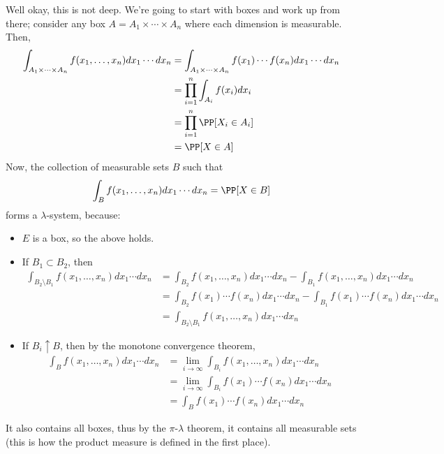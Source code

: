 \documentclass[11pt, headheight=30pt]{scrartcl}
\begin{document}
Well okay, this is not deep. We're going to start with boxes and work up
from there; consider any box $A = A_1\times \cdots \times A_n$ where
each dimension is measurable. Then,
\begin{align*}
    \int_{A_1\times \cdots \times A_n} f(x_1, \dots, x_n)dx_1\cdots dx_n
    &= \int_{A_1\times \cdots \times A_n} f(x_1)\cdots f(x_n)dx_1\cdots dx_n\\
    &= \prod_{i=1}^n \int_{A_i} f(x_i)dx_i\\
    &= \prod_{i=1}^n \PP[X_i\in A_i]\\
    &= \PP[X\in A]
\end{align*}
Now, the collection of measurable sets $B$ such that
\[
    \int_B f(x_1, \dots, x_n)dx_1\cdots dx_n = \PP[X\in B]
\]
forms a $\lambda$-system, because:
\begin{itemize}
    \item $E$ is a box, so the above holds.
    \item If $B_1\subset B_2$, then
    \begin{align*}
        \int_{B_2\setminus B_1} f(x_1, \dots, x_n)dx_1\cdots dx_n &= \int_{B_2} f(x_1, \dots, x_n)dx_1\cdots dx_n - \int_{B_1} f(x_1, \dots, x_n)dx_1\cdots dx_n\\
        &= \int_{B_2} f(x_1)\cdots f(x_n)dx_1\cdots dx_n - \int_{B_1} f(x_1)\cdots f(x_n)dx_1\cdots dx_n\\
        &= \int_{B_2\setminus B_1} f(x_1, \dots, x_n)dx_1\cdots dx_n
    \end{align*}
    \item If $B_i\uparrow B$, then by the monotone convergence theorem,
    \begin{align*}
        \int_{B} f(x_1, \dots, x_n)dx_1\cdots dx_n &= \lim_{i\to \infty} \int_{B_i} f(x_1, \dots, x_n)dx_1\cdots dx_n\\
        &= \lim_{i\to \infty} \int_{B_i} f(x_1)\cdots f(x_n)dx_1\cdots dx_n\\
        &= \int_{B} f(x_1)\cdots f(x_n)dx_1\cdots dx_n
    \end{align*}
\end{itemize}

It also contains all boxes, thus by the $\pi$-$\lambda$ theorem,
it contains all measurable sets (this is how the product measure
is defined in the first place).
\end{document}

